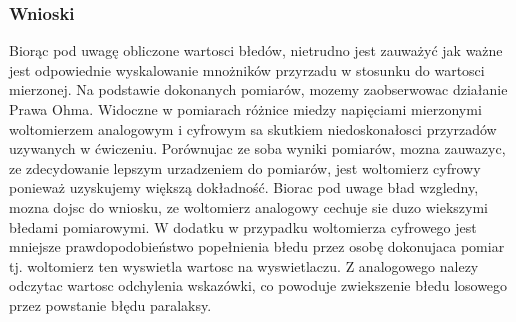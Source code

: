 \documentclass{extarticle}  %
\begin{document}
            \subsubsection{Wnioski}
                Biorąc pod uwagę obliczone wartosci błedów, nietrudno jest zauważyć jak ważne
                jest odpowiednie wyskalowanie mnożników przyrzadu w stosunku do wartosci mierzonej. 
                Na podstawie dokonanych pomiarów, mozemy zaobserwowac działanie Prawa Ohma. 
                Widoczne w pomiarach różnice miedzy napięciami mierzonymi woltomierzem analogowym i cyfrowym sa skutkiem niedoskonałosci przyrzadów uzywanych w ćwiczeniu. 
                Porównujac ze soba wyniki pomiarów, mozna zauwazyc, ze zdecydowanie lepszym urzadzeniem do pomiarów, jest woltomierz cyfrowy ponieważ uzyskujemy większą dokładność. 
                Biorac pod uwage bład wzgledny, mozna dojsc do wniosku, ze woltomierz analogowy cechuje sie duzo wiekszymi błedami pomiarowymi.
                W dodatku w przypadku woltomierza cyfrowego jest mniejsze prawdopodobieństwo popełnienia błedu przez osobę dokonujaca pomiar tj.
                woltomierz ten wyswietla wartosc na wyswietlaczu. 
                Z analogowego nalezy odczytac wartosc odchylenia wskazówki, co powoduje zwiekszenie błedu losowego przez powstanie błędu paralaksy.
    
\end{document}
